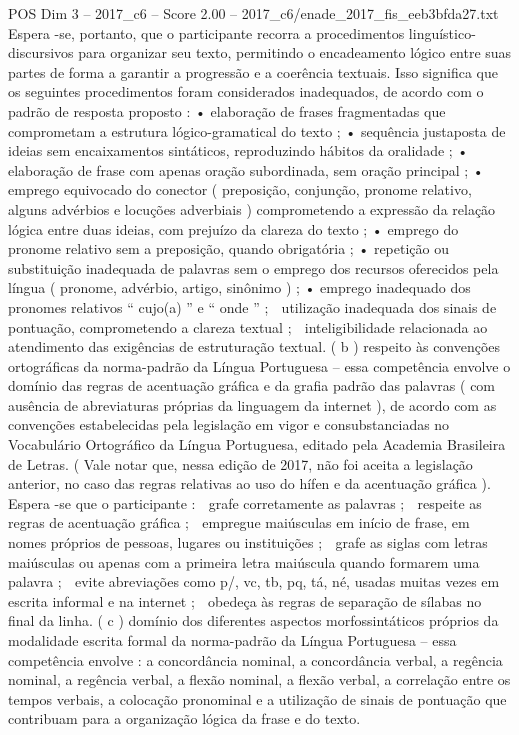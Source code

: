 \begin{textsample}{POS Dim 3 – 2017\_c6 – Score 2.00 – 2017\_c6/enade\_2017\_fis\_eeb3bfda27.txt}
Espera -se, portanto, que o participante recorra a procedimentos linguístico-discursivos para organizar seu texto, permitindo o encadeamento lógico entre suas partes de forma a garantir a progressão e a coerência textuais.
Isso significa que os seguintes procedimentos foram considerados inadequados, de acordo com o padrão de resposta proposto : • elaboração de frases fragmentadas que comprometam a estrutura lógico-gramatical do texto ; • sequência justaposta de ideias sem encaixamentos sintáticos, reproduzindo hábitos da oralidade ; • elaboração de frase com apenas oração subordinada, sem oração principal ; • emprego equivocado do conector ( preposição, conjunção, pronome relativo, alguns advérbios e locuções adverbiais ) comprometendo a expressão da relação lógica entre duas ideias, com prejuízo da clareza do texto ; • emprego do pronome relativo sem a preposição, quando obrigatória ; • repetição ou substituição inadequada de palavras sem o emprego dos recursos oferecidos pela língua ( pronome, advérbio, artigo, sinônimo ) ; • emprego inadequado dos pronomes relativos “ cujo(a) ” e “ onde ” ;  utilização inadequada dos sinais de pontuação, comprometendo a clareza textual ;  inteligibilidade relacionada ao atendimento das exigências de estruturação textual. ( b ) respeito às convenções ortográficas da norma-padrão da Língua Portuguesa – essa competência envolve o domínio das regras de acentuação gráfica e da grafia padrão das palavras ( com ausência de abreviaturas próprias da linguagem da internet ), de acordo com as convenções estabelecidas pela legislação em vigor e consubstanciadas no Vocabulário Ortográfico da Língua Portuguesa, editado pela Academia Brasileira de Letras. ( Vale notar que, nessa edição de 2017, não foi aceita a legislação anterior, no caso das regras relativas ao uso do hífen e da acentuação gráfica ).
Espera -se que o participante :  grafe corretamente as palavras ;  respeite as regras de acentuação gráfica ;  empregue maiúsculas em início de frase, em nomes próprios de pessoas, lugares ou instituições ;  grafe as siglas com letras maiúsculas ou apenas com a primeira letra maiúscula quando formarem uma palavra ;  evite abreviações como p/, vc, tb, pq, tá, né, usadas muitas vezes em escrita informal e na internet ;  obedeça às regras de separação de sílabas no final da linha. ( c ) domínio dos diferentes aspectos morfossintáticos próprios da modalidade escrita formal da norma-padrão da Língua Portuguesa – essa competência envolve : a concordância nominal, a concordância verbal, a regência nominal, a regência verbal, a flexão nominal, a flexão verbal, a correlação entre os tempos verbais, a colocação pronominal e a utilização de sinais de pontuação que contribuam para a organização lógica da frase e do texto.

\end{textsample}
